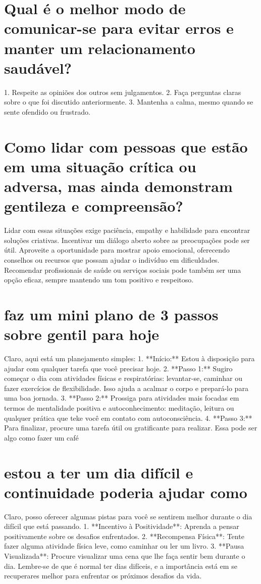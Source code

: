 \documentclass[11pt,a4paper]{article}
\begin{document}
\section{Qual é o melhor modo de comunicar-se para evitar erros e manter um relacionamento saudável?}
1. Respeite as opiniões dos outros sem julgamentos. 2. Faça perguntas claras sobre o que foi discutido anteriormente. 3. Mantenha a calma, mesmo quando se sente ofendido ou frustrado.

\section{Como lidar com pessoas que estão em uma situação crítica ou adversa, mas ainda demonstram gentileza e compreensão?}
Lidar com essas situações exige paciência, empathy e habilidade para encontrar soluções criativas. Incentivar um diálogo aberto sobre as preocupações pode ser útil. Aproveite a oportunidade para mostrar apoio emocional, oferecendo conselhos ou recursos que possam ajudar o indivíduo em dificuldades. Recomendar profissionais de saúde ou serviços sociais pode também ser uma opção eficaz, sempre mantendo um tom positivo e respeitoso.

\section{faz um mini plano de 3 passos sobre gentil para hoje}
Claro, aqui está um planejamento simples: 1. **Início:** Estou à disposição para ajudar com qualquer tarefa que você precisar hoje. 2. **Passo 1:** Sugiro começar o dia com atividades físicas e respiratórias: levantar-se, caminhar ou fazer exercícios de flexibilidade. Isso ajuda a acalmar o corpo e prepará-lo para uma boa jornada. 3. **Passo 2:** Prossiga para atividades mais focadas em termos de mentalidade positiva e autoconhecimento: meditação, leitura ou qualquer prática que teke você em contato com autoconsciência. 4. **Passo 3:** Para finalizar, procure uma tarefa útil ou gratificante para realizar. Essa pode ser algo como fazer um café

\section{estou a ter um dia difícil e continuidade poderia ajudar como}
Claro, posso oferecer algumas pistas para você se sentirem melhor durante o dia difícil que está passando. 1. **Incentivo à Positividade**: Aprenda a pensar positivamente sobre os desafios enfrentados. 2. **Recompensa Física**: Tente fazer alguma atividade física leve, como caminhar ou ler um livro. 3. **Pausa Visualizada**: Procure visualizar uma cena que lhe faça sentir bem durante o dia. Lembre-se de que é normal ter dias difíceis, e a importância está em se recuperares melhor para enfrentar os próximos desafios da vida.
\end{document}
